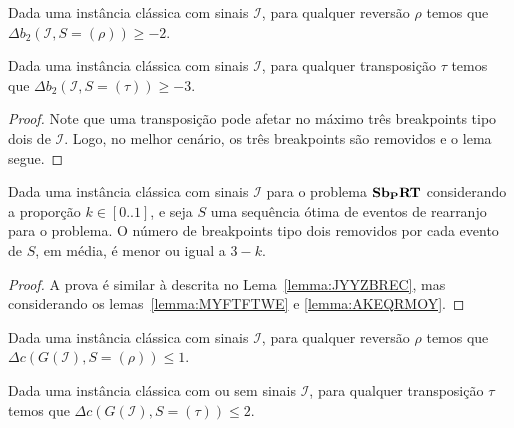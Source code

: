 \begin{lemma}\label{lemma:MYFTFTWE}
Dada uma instância clássica com sinais $\mathcal{I}$, para qualquer reversão $\rho$ temos que $\Delta b_2(\mathcal{I}, S = (\rho)) \ge -2$.
\end{lemma}

\begin{lemma}\label{lemma:AKEQRMOY}
Dada uma instância clássica com sinais $\mathcal{I}$, para qualquer transposição $\tau$ temos que $\Delta b_2(\mathcal{I}, S = (\tau)) \ge -3$.
\end{lemma}
\begin{proof}
Note que uma transposição pode afetar no máximo três breakpoints tipo dois de $\mathcal{I}$. Logo, no melhor cenário, os três breakpoints são removidos e o lema segue.
\end{proof}

\begin{lemma}\label{lemma:ZZLNPRWJ}
Dada uma instância clássica com sinais $\mathcal{I}$ para o problema $\textbf{Sb\textsubscript{P}RT}{}$ considerando a proporção $k \in [0..1]$, e seja $S$ uma sequência ótima de eventos de rearranjo para o problema. O número de breakpoints tipo dois removidos por cada evento de $S$, em média, é menor ou igual a $3-k$.
\end{lemma}
\begin{proof}
A prova é similar à descrita no Lema~\ref{lemma:JYYZBREC}, mas considerando os lemas~\ref{lemma:MYFTFTWE} e \ref{lemma:AKEQRMOY}.
\end{proof}

\begin{lemma}\label{lemma:WMUBEYJS}
Dada uma instância clássica com sinais $\mathcal{I}$, para qualquer reversão $\rho$ temos que $\Delta c(G(\mathcal{I}), S = (\rho)) \le 1$.
\end{lemma}

\begin{lemma}\label{lemma:WITSEXYZ}
Dada uma instância clássica com ou sem sinais $\mathcal{I}$, para qualquer transposição $\tau$ temos que $\Delta c(G(\mathcal{I}), S = (\tau)) \le 2$.
\end{lemma}

